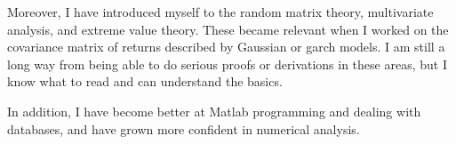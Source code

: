 \documentclass{report}
\begin{document}
Moreover, I have introduced myself to the random matrix theory,
multivariate analysis, and extreme value theory. These became relevant
when I worked on the covariance matrix of returns described by
Gaussian or \gls{garch} models. I am still a long way from being able
to do serious proofs or derivations in these areas, but I know what to
read and can understand the basics.

In addition, I have become better at Matlab programming and dealing
with databases, and have grown more confident in numerical analysis.


\appendix




\end{document}
